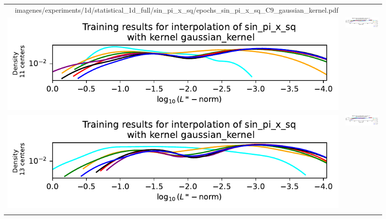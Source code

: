 \documentclass[12pt]{report} %
\begin{document}
\begin{figure}[H]
\begin{tabular}{rl}
{        {imagenes/experiments/1d/statistical_1d_full/sin_pi_x_sq/epochs_sin_pi_x_sq_C9_gaussian_kernel.pdf}}
    \\
    {\includegraphics[width=.68\textwidth, trim={.58cm 1.25cm 0 1.17cm},clip=true]
    {imagenes/experiments/1d/statistical_1d_full/sin_pi_x_sq/linf_sin_pi_x_sq_C11_gaussian_kernel.pdf}} & {\includegraphics[width=.62\textwidth, trim={1cm 2.4cm 2.88cm 1.17cm},clip=true]
    {imagenes/experiments/1d/statistical_1d_full/sin_pi_x_sq/epochs_sin_pi_x_sq_C11_gaussian_kernel.pdf}}                                                                                     \\
    {\includegraphics[width=.68\textwidth, trim={.58cm 1.25cm 0 1.17cm},clip=true]
    {imagenes/experiments/1d/statistical_1d_full/sin_pi_x_sq/linf_sin_pi_x_sq_C13_gaussian_kernel.pdf}} & {\includegraphics[width=.62\textwidth, trim={1cm 2.4cm 2.88cm 1.17cm},clip=true]
        {imagenes/experiments/1d/statistical_1d_full/sin_pi_x_sq/epochs_sin_pi_x_sq_C13_gaussian_kernel.pdf}}
    \\
    {\includegraphics[width=.68\textwidth, trim={.58cm 0.2cm 0 1.17cm},clip=true]
}
\end{tabular}
\end{figure}
\end{document}
